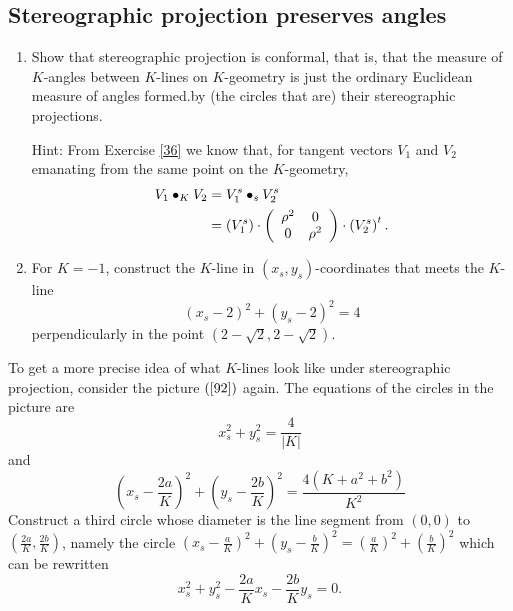 \documentclass{ximera}
\begin{document}
\subsection*{Stereographic projection preserves angles}

\begin{exercise}\hfil
\begin{enumerate}
\item Show that stereographic projection is conformal, that is, that
  the measure of $K$-angles between $K$-lines on $K$-geometry is just
  the ordinary Euclidean measure of angles formed.by (the circles that
  are) their stereographic projections.

Hint: From Exercise \ref{36} we know that, for tangent vectors $V_{1}$ and
$V_{2}$ emanating from the same point on the $K$-geometry,
\begin{align*}
V_{1}\bullet_{K}V_{2}  &  =V_{1}^{s}\bullet_{s}V_{2}^{s}\\
&  =\left(  V_{1}^{s}\right)  \cdot\left(
\begin{array}
[c]{cc}%
\rho^{2} & 0\\
0 & \rho^{2}%
\end{array}
\right)  \cdot\left(  V_{2}^{s}\right)  ^{t}.
\end{align*}


\item For $K=-1$, construct the $K$-line in $\left( x_{s},y_{s}\right)
  $-coordinates that meets the $K$-line
\[
\left(  x_{s}-2\right)  ^{2}+\left(  y_{s}-2\right)  ^{2}=4
\]
perpendicularly in the point $\left(  2-\sqrt{2},2-\sqrt{2}\right)  $.
\end{enumerate}
\end{exercise}

To get a more precise idea of what $K$-lines look like under stereographic
projection, consider the picture $\left(  \ref{92}\right)  $ again. The
equations of the circles in the picture are%
\begin{equation}
x_{s}^{2}+y_{s}^{2}=\frac{4}{\left\vert K\right\vert } \label{93}%
\end{equation}
and%
\begin{equation}
\left(  x_{s}-\frac{2a}{K}\right)  ^{2}+\left(  y_{s}-\frac{2b}{K}\right)
^{2}=\frac{4\left(  K+a^{2}+b^{2}\right)  }{K^{2}} \label{94}%
\end{equation}
Construct a third circle whose diameter is the line segment from $\left(
0,0\right)  $ to $\left(  \frac{2a}{K},\frac{2b}{K}\right)  $, namely the
circle $\left(  x_{s}-\frac{a}{K}\right)  ^{2}+\left(  y_{s}-\frac{b}%
{K}\right)  ^{2}=\left(  \frac{a}{K}\right)  ^{2}+\left(  \frac{b}{K}\right)
^{2}$ which can be rewritten%
\begin{equation}
x_{s}^{2}+y_{s}^{2}-\frac{2a}{K}x_{s}-\frac{2b}{K}y_{s}=0. \label{95}%
\end{equation}
\end{document}
